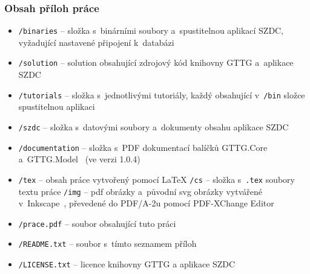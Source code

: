 \subsubsection{Obsah příloh práce}
\begin{itemize}
	\item \texttt{/binaries} -- složka s~binárními soubory a~spustitelnou aplikací SZDC, vyžadující nastavené připojení k~databázi
	\item \texttt{/solution} -- solution obsahující zdrojový kód knihovny GTTG a~aplikace SZDC
	\item \texttt{/tutorials} -- složka s~jednotlivými tutoriály, každý obsahující v~\texttt{/bin} složce spustitelnou aplikaci 
	\item \texttt{/szdc} -- složka s~datovými soubory a~dokumenty obsahu aplikace SZDC
	\item \texttt{/documentation} -- složka s~PDF dokumentací balíčků GTTG.Core~\cite{GTTG.Core.NuGet} a~GTTG.Model~\cite{GTTG.Model.NuGet} (ve verzi 1.0.4)
	\item \texttt{/tex} -- obsah práce vytvořený pomocí \LaTeX{} 
	\subitem \texttt{/cs} -- složka s~\texttt{.tex} soubory textu práce
	\subitem \texttt{/img} -- pdf obrázky a~původní svg obrázky vytvářené v~Inkscape~\cite{Inkscape}, převedené do PDF/A-2u pomocí PDF-XChange Editor~\cite{PDF-XChange-Editor}
	\item \texttt{/prace.pdf} -- soubor obsahující tuto práci
	\item \texttt{/README.txt} -- soubor s~tímto seznamem příloh
	\item \texttt{/LICENSE.txt} -- licence knihovny GTTG a aplikace SZDC
\end{itemize}